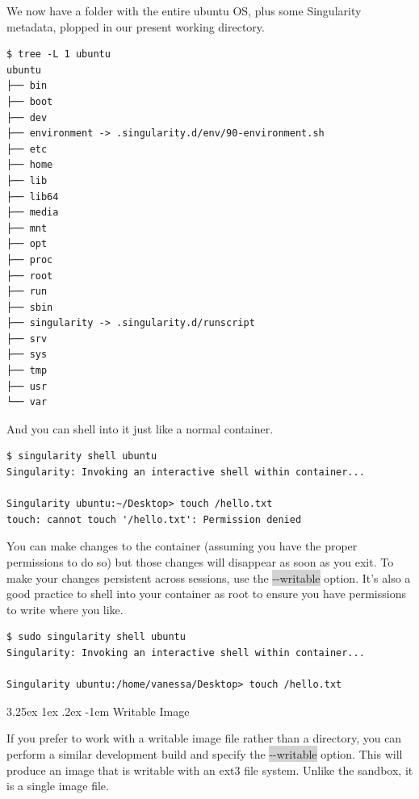 \documentclass[a4paper]{article}
\makeatletter
\renewcommand\paragraph{\@startsection{paragraph}{5}{\z@}%
  {3.25ex \@plus1ex \@minus.2ex}%
  {-1em}%
  {\normalfont\normalsize\bfseries}}
\makeatother
\begin{document}
We now have a folder with the entire ubuntu OS, plus some Singularity metadata, plopped in our present working directory.\\[0.1in]

\begin{lstlisting}[frame=single] 
 $ tree -L 1 ubuntu
ubuntu
├── bin
├── boot
├── dev
├── environment -> .singularity.d/env/90-environment.sh
├── etc
├── home
├── lib
├── lib64
├── media
├── mnt
├── opt
├── proc
├── root
├── run
├── sbin
├── singularity -> .singularity.d/runscript
├── srv
├── sys
├── tmp
├── usr
└── var
\end{lstlisting}

And you can shell into it just like a normal container.

\begin{lstlisting}[frame=single]  
$ singularity shell ubuntu
Singularity: Invoking an interactive shell within container...

Singularity ubuntu:~/Desktop> touch /hello.txt
touch: cannot touch '/hello.txt': Permission denied
\end{lstlisting}

		You can make changes to the container (assuming you have the proper permissions to do so) but those changes will disappear as soon as you exit. To make your changes persistent across sessions, use the \colorbox{lightgray}{-{}-writable} option. It’s also a good practice to shell into your container as root to ensure you have permissions to write where you like.\\
		
\begin{lstlisting}[frame=single]  
$ sudo singularity shell ubuntu
Singularity: Invoking an interactive shell within container...

Singularity ubuntu:/home/vanessa/Desktop> touch /hello.txt

\end{lstlisting}		
	
		\paragraph{Writable Image}
		
		If you prefer to work with a writable image file rather than a directory, you can perform a similar development build and specify the \colorbox{lightgray}{-{}-writable} option. This will produce an image that is writable with an ext3 file system. Unlike the sandbox, it is a single image file.
\end{document}
